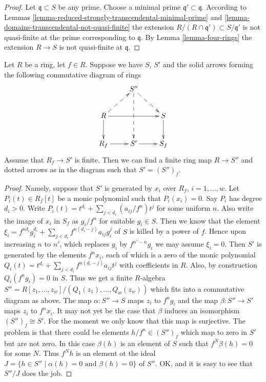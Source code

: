 \begin{proof}
Let $\mathfrak q \subset S$ be any prime.
Choose a minimal prime $\mathfrak q' \subset \mathfrak q$.
According to Lemmas
\ref{lemma-reduced-strongly-transcendental-minimal-prime} and
\ref{lemma-domains-transcendental-not-quasi-finite}
the extension $R/(R \cap \mathfrak q') \subset
S/\mathfrak q'$ is not quasi-finite at the prime corresponding
to $\mathfrak q$. By Lemma \ref{lemma-four-rings}
the extension $R \to S$ is not quasi-finite
at $\mathfrak q$.
\end{proof}

\begin{lemma}
\label{lemma-finite-after-localization}
Let $R$ be a ring, let $f \in R$.
Suppose we have $S$, $S'$ and the solid arrows
forming the following commutative diagram of rings
$$
\xymatrix{
& S'' \ar@{-->}[rd] \ar@{-->}[dd] &
\\
R \ar[rr] \ar@{-->}[ru] \ar[d] &  & S \ar[d]
\\
R_f \ar[r] & S' \ar[r] & S_f
}
$$
Assume that $R_f \to S'$ is finite. Then we can find
a finite ring map $R \to S''$ and dotted arrows as
in the diagram such that $S' = (S'')_f$.
\end{lemma}

\begin{proof}
Namely, suppose that $S'$ is generated by
$x_i$ over $R_f$, $i = 1, \ldots, w$. Let $P_i(t) \in R_f[t]$
be a monic polynomial such that $P_i(x_i) = 0$.
Say $P_i$ has degree $d_i > 0$. Write
$P_i(t) = t^{d_i} + \sum_{j < d_i} (a_{ij}/f^n) t^j$
for some uniform $n$. Also write
the image of $x_i$ in $S_f$ as $g_i / f^n$
for suitable $g_i \in S$. Then we know
that the element
$\xi_i = f^{nd_i} g_i^{d_i} + \sum_{j < d_i} f^{n(d_i - j)} a_{ij} g_i^j$
of $S$ is killed by a power of $f$.
Hence upon increasing $n$ to $n'$, which replaces
$g_i$ by $f^{n' - n}g_i$ we may assume $\xi_i = 0$.
Then $S'$ is generated by the elements
$f^n x_i$, each of which is a zero of the
monic polynomial $Q_i(t) = t^{d_i} +
\sum_{j < d_i} f^{n(d_i - j)} a_{ij} t^j$
with coefficients in $R$. Also, by construction
$Q_i(f^ng_i) = 0$ in $S$. Thus we get a finite $R$-algebra
$S'' = R[z_1, \ldots, z_w]/(Q_1(z_1), \ldots, Q_w(z_w))$
which fits into a commutative diagram as above.
The map $\alpha : S'' \to S$ maps $z_i$ to $f^ng_i$ and
the map $\beta : S'' \to S'$ maps $z_i$ to $f^nx_i$.
It may not yet be the case that $\beta$ induces an
isomorphism $(S'')_f \cong S'$.
For the moment we only know that this map
is surjective. The problem is that there could be
elements $h/f^n \in (S'')_f$ which map to zero
in $S'$ but are not zero. In this case $\beta(h)$
is an element of $S$ such that $f^N \beta(h) = 0$
for some $N$. Thus $f^N h$ is an element ot the ideal
$J = \{h \in S'' \mid \alpha(h) = 0 \text{ and }
\beta(h) = 0\}$ of $S''$. OK, and it is easy to see that
$S''/J$ does the job.
\end{proof}

